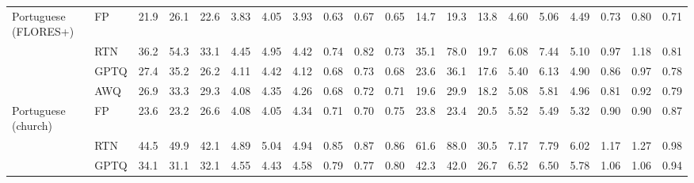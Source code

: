 \begin{landscape}
\begin{longtable}{llrrrrrrrrrrrrrrrrrr}
\midrule
Portuguese (FLORES+) & FP & 21.9 & 26.1 & 22.6 & 3.83 & 4.05 & 3.93 & 0.63 & 0.67 & 0.65 & 14.7 & 19.3 & 13.8 & 4.60 & 5.06 & 4.49 & 0.73 & 0.80 & 0.71 \\
 & RTN & \cellcolor{loss!2}36.2 & \cellcolor{loss!4}54.3 & \cellcolor{loss!2}33.1 & \cellcolor{loss!20}4.45 & \cellcolor{loss!30}4.95 & \cellcolor{loss!16}4.42 & \cellcolor{loss!18}0.74 & \cellcolor{loss!25}0.82 & \cellcolor{loss!13}0.73 & \cellcolor{loss!1}35.1 & \cellcolor{loss!2}78.0 & \cellcolor{loss!0}19.7 & \cellcolor{loss!7}6.08 & \cellcolor{loss!11}7.44 & \cellcolor{loss!3}5.10 & \cellcolor{loss!13}0.97 & \cellcolor{loss!21}1.18 & \cellcolor{loss!5}0.81 \\
 & GPTQ & \cellcolor{loss!1}27.4 & \cellcolor{loss!1}35.2 & \cellcolor{loss!1}26.2 & \cellcolor{loss!9}4.11 & \cellcolor{loss!12}4.42 & \cellcolor{loss!6}4.12 & \cellcolor{loss!8}0.68 & \cellcolor{loss!10}0.73 & \cellcolor{loss!5}0.68 & \cellcolor{loss!0}23.6 & \cellcolor{loss!1}36.1 & \cellcolor{loss!0}17.6 & \cellcolor{loss!4}5.40 & \cellcolor{loss!5}6.13 & \cellcolor{loss!2}4.90 & \cellcolor{loss!7}0.86 & \cellcolor{loss!9}0.97 & \cellcolor{loss!4}0.78 \\
 & AWQ & \cellcolor{loss!1}26.9 & \cellcolor{loss!1}33.3 & \cellcolor{loss!1}29.3 & \cellcolor{loss!8}4.08 & \cellcolor{loss!10}4.35 & \cellcolor{loss!11}4.26 & \cellcolor{loss!8}0.68 & \cellcolor{loss!8}0.72 & \cellcolor{loss!9}0.71 & \cellcolor{loss!0}19.6 & \cellcolor{loss!0}29.9 & \cellcolor{loss!0}18.2 & \cellcolor{loss!2}5.08 & \cellcolor{loss!3}5.81 & \cellcolor{loss!2}4.96 & \cellcolor{loss!4}0.81 & \cellcolor{loss!7}0.92 & \cellcolor{loss!4}0.79 \\
\midrule
Portuguese (church) & FP & 23.6 & 23.2 & 26.6 & 4.08 & 4.05 & 4.34 & 0.71 & 0.70 & 0.75 & 23.8 & 23.4 & 20.5 & 5.52 & 5.49 & 5.32 & 0.90 & 0.90 & 0.87 \\
 & RTN & \cellcolor{loss!3}44.5 & \cellcolor{loss!4}49.9 & \cellcolor{loss!2}42.1 & \cellcolor{loss!27}4.89 & \cellcolor{loss!32}5.04 & \cellcolor{loss!20}4.94 & \cellcolor{loss!23}0.85 & \cellcolor{loss!28}0.87 & \cellcolor{loss!18}0.86 & \cellcolor{loss!1}61.6 & \cellcolor{loss!2}88.0 & \cellcolor{loss!0}30.5 & \cellcolor{loss!8}7.17 & \cellcolor{loss!11}7.79 & \cellcolor{loss!3}6.02 & \cellcolor{loss!15}1.17 & \cellcolor{loss!20}1.27 & \cellcolor{loss!6}0.98 \\
 & GPTQ & \cellcolor{loss!2}34.1 & \cellcolor{loss!1}31.1 & \cellcolor{loss!1}32.1 & \cellcolor{loss!15}4.55 & \cellcolor{loss!12}4.43 & \cellcolor{loss!8}4.58 & \cellcolor{loss!13}0.79 & \cellcolor{loss!12}0.77 & \cellcolor{loss!8}0.80 & \cellcolor{loss!1}42.3 & \cellcolor{loss!1}42.0 & \cellcolor{loss!0}26.7 & \cellcolor{loss!5}6.52 & \cellcolor{loss!5}6.50 & \cellcolor{loss!2}5.78 & \cellcolor{loss!9}1.06 & \cellcolor{loss!9}1.06 & \cellcolor{loss!4}0.94 \\

\end{longtable}
\end{landscape}
